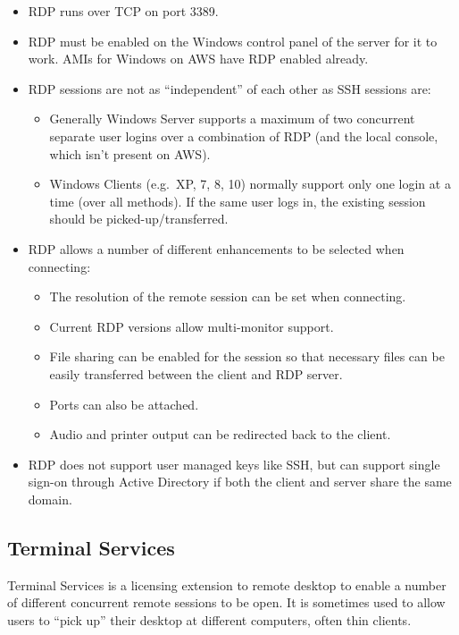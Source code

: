 \begin{itemize}
\item
  RDP runs over TCP on port 3389.
\item
  RDP must be enabled on the Windows control panel of the server for it
  to work. AMIs for Windows on AWS have RDP enabled already.
\item
  RDP sessions are not as ``independent'' of each other as SSH sessions
  are:

  \begin{itemize}
  \item
    Generally Windows Server supports a maximum of two concurrent
    separate user logins over a combination of RDP (and the local
    console, which isn't present on AWS).
  \item
    Windows Clients (e.g.~XP, 7, 8, 10) normally support only one login
    at a time (over all methods). If the same user logs in, the existing
    session should be picked-up/transferred.
  \end{itemize}
\item
  RDP allows a number of different enhancements to be selected when
  connecting:

  \begin{itemize}
  \item
    The resolution of the remote session can be set when connecting.
  \item
    Current RDP versions allow multi-monitor support.
  \item
    File sharing can be enabled for the session so that necessary files
    can be easily transferred between the client and RDP server.
  \item
    Ports can also be attached.
  \item
    Audio and printer output can be redirected back to the client.
  \end{itemize}
\item
  RDP does not support user managed keys like SSH, but can support
  single sign-on through Active Directory if both the client and server
  share the same domain.
\end{itemize}

\subsection{Terminal Services}\label{terminal-services}

Terminal Services is a licensing extension to remote desktop to enable a
number of different concurrent remote sessions to be open. It is
sometimes used to allow users to ``pick up'' their desktop at different
computers, often thin clients.


